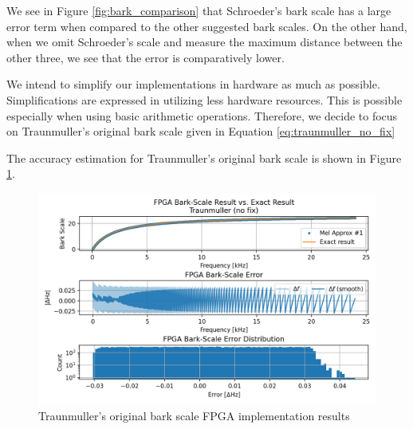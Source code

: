 We see in Figure \ref{fig:bark_comparison} that Schroeder's bark scale
has a large error term when compared to the other suggested bark scales.
On the other hand, when we omit Schroeder's scale
and measure the maximum distance between the other three,
we see that the error is comparatively lower. 

We intend to simplify our implementations in hardware as much as possible.
Simplifications are expressed in utilizing less hardware resources.
This is possible especially when using basic arithmetic operations.
Therefore, we decide to focus on Traunmuller's original bark scale
given in Equation \ref{eq:traunmuller_no_fix}

The accuracy estimation for Traunmuller's original bark scale
is shown in Figure \ref{fig:bark_traunmuller_no_fix}.

\begin{figure}[H]
    \centering
    \includegraphics[width=0.95\linewidth]{Scaling/images/bark_traunmuller_no_fix.png}
    \caption{Traunmuller's original bark scale FPGA implementation results}\label{fig:bark_traunmuller_no_fix}
\end{figure}

